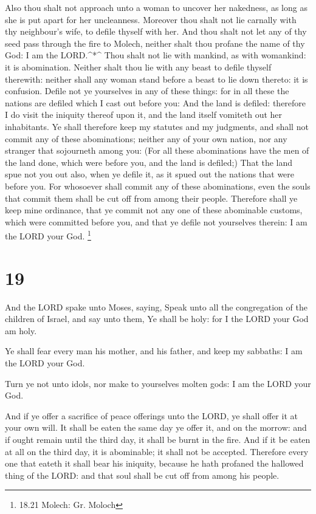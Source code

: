  Also thou shalt not approach unto a woman to uncover her
nakedness, as long as she is put apart for her uncleanness.
 Moreover thou shalt not lie carnally with thy neighbour's
wife, to defile thyself with her.  And thou shalt not let
any of thy seed pass through the fire to Molech, neither shalt thou
profane the name of thy God: I am the LORD.\^{}*\^{}  Thou
shalt not lie with mankind, as with womankind: it is abomination.
 Neither shalt thou lie with any beast to defile thyself
therewith: neither shall any woman stand before a beast to lie down
thereto: it is confusion.  Defile not ye yourselves in any
of these things: for in all these the nations are defiled which I cast
out before you:  And the land is defiled: therefore I do
visit the iniquity thereof upon it, and the land itself vomiteth out her
inhabitants.  Ye shall therefore keep my statutes and my
judgments, and shall not commit any of these abominations; neither any
of your own nation, nor any stranger that sojourneth among you:
 (For all these abominations have the men of the land done,
which were before you, and the land is defiled;)  That the
land spue not you out also, when ye defile it, as it spued out the
nations that were before you.  For whosoever shall commit
any of these abominations, even the souls that commit them shall be cut
off from among their people.  Therefore shall ye keep mine
ordinance, that ye commit not any one of these abominable customs, which
were committed before you, and that ye defile not yourselves therein: I
am the LORD your God. \footnote{18.21 Molech: Gr. Moloch}

\hypertarget{section-18}{%
\section{19}\label{section-18}}

 And the LORD spake unto Moses, saying,  Speak
unto all the congregation of the children of Israel, and say unto them,
Ye shall be holy: for I the LORD your God am holy.

 Ye shall fear every man his mother, and his father, and
keep my sabbaths: I am the LORD your God.

 Turn ye not unto idols, nor make to yourselves molten gods:
I am the LORD your God.

 And if ye offer a sacrifice of peace offerings unto the
LORD, ye shall offer it at your own will.  It shall be eaten
the same day ye offer it, and on the morrow: and if ought remain until
the third day, it shall be burnt in the fire.  And if it be
eaten at all on the third day, it is abominable; it shall not be
accepted.  Therefore every one that eateth it shall bear his
iniquity, because he hath profaned the hallowed thing of the LORD: and
that soul shall be cut off from among his people.

